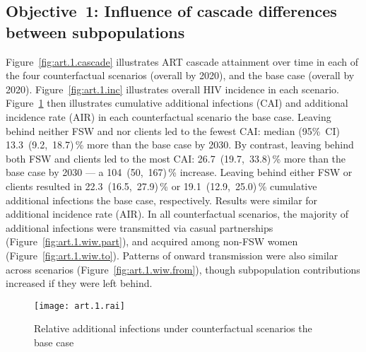 \subsection{Objective~1: Influence of cascade differences between subpopulations}\label{art.res.1}
Figure~\ref{fig:art.1.cascade} illustrates ART cascade attainment over time
in each of the four counterfactual scenarios (\casmd overall by 2020),
and the base case (\cashi overall by 2020).
Figure~\ref{fig:art.1.inc} illustrates overall HIV incidence in each scenario.
Figure~\ref{fig:art.1.rai} then illustrates
cumulative additional infections (CAI) and additional incidence rate (AIR)
in each counterfactual scenario \vs the base case.
Leaving behind neither FSW and nor clients led to the fewest CAI: median (95\%~CI)
13.3~(9.2,~18.7)\,\% more than the base case by 2030. %
By contrast, leaving behind both FSW and clients led to the most CAI:
26.7~(19.7,~33.8)\,\% more than the base case by 2030 %
--- a 104~(50,~167)\,\% increase. %
Leaving behind either FSW or clients resulted in
22.3~(16.5,~27.9)\,\% or 19.1~(12.9,~25.0)\,\% cumulative additional infections
\vs the base case, respectively. %
Results were similar for additional incidence rate (AIR).
In all counterfactual scenarios, the majority of additional infections were
transmitted via casual partnerships (Figure~\ref{fig:art.1.wiw.part}), %
and acquired among non-FSW women (Figure~\ref{fig:art.1.wiw.to}). %
Patterns of onward transmission were also similar across scenarios %
(Figure~\ref{fig:art.1.wiw.from}),
though subpopulation contributions increased if they were left behind.
\begin{figure}[h]
  \centering\texttt{[image: art.1.rai]}
  \caption{Relative additional infections under counterfactual scenarios \vs the base case}
  \label{fig:art.1.rai}
\end{figure}
